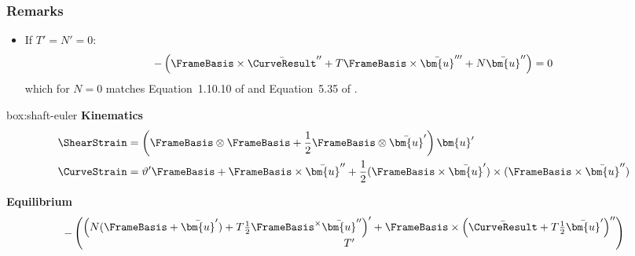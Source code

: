 \subsubsection{Remarks}
\begin{itemize}
    \item If $T' = N' = 0$:
\begin{equation*}
-\left(
\FrameBasis \times \bar{\CurveResult}'' +  T\FrameBasis  \times \bar{\bm{u}}''' + N \bar{\bm{u}}''
\right) = 0 
\end{equation*}
which for \(N=0\) matches Equation~1.10.10 of \textcite{bažant2010stability} and Equation~5.35 of \textcite{ziegler1977principles}.

\end{itemize}

\begin{ambox}{box:shaft-euler}
\textbf{Kinematics}
$$
\begin{aligned}
\ShearStrain &= \left(\FrameBasis \otimes\FrameBasis  + \frac{1}{2}\FrameBasis \otimes\bar{\bm{u}}^{\prime}\right)\bm{u}^{\prime} \\
\CurveStrain &= \vartheta^{\prime} \FrameBasis  
+ \FrameBasis \times\bar{\bm{u}}^{\prime\prime} 
+ \frac{1}{2}(\FrameBasis \times\bar{\bm{u}}^{\prime})\times(\FrameBasis \times\bar{\bm{u}}^{\prime\prime}) 
\end{aligned}
$$

\textbf{Equilibrium}
\[
-\begin{pmatrix}
\left(N (\FrameBasis  + \bar{\bm{u}}') + T\frac{1}{2}\FrameBasis^\times \bar{\bm{u}}'' \right)' + \FrameBasis \times\left(\bar{\CurveResult} + T \frac{1}{2} \bar{\bm{u}}' \right)''\\
T' \\ 
\end{pmatrix}
\]
\end{ambox}